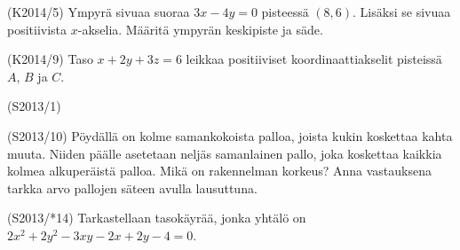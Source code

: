 \begin{tehtava}(K2014/5)
Ympyrä sivuaa suoraa $3x-4y=0$ pisteessä $(8,6)$. Lisäksi se sivuaa positiivista $x$-akselia.
Määritä ympyrän keskipiste ja säde. 
\end{tehtava}


\begin{tehtava}(K2014/9)
Taso $x+2y+3z=6$ leikkaa positiiviset koordinaattiakselit pisteissä $A$, $B$ ja $C$.
\end{tehtava}

\begin{tehtava} (S2013/1)

\end{tehtava}

\begin{tehtava}(S2013/10)
Pöydällä on kolme samankokoista palloa, joista kukin koskettaa kahta muuta. Niiden päälle asetetaan neljäs samanlainen  pallo, joka koskettaa kaikkia kolmea alkuperäistä palloa.
Mikä on rakennelman korkeus? Anna vastauksena tarkka arvo pallojen säteen avulla lausuttuna. 
\end{tehtava}

\begin{tehtava} (S2013/*14)
Tarkastellaan tasokäyrää, jonka yhtälö on $2x^2+2y^2-3xy-2x+2y-4=0$.
\end{tehtava}

